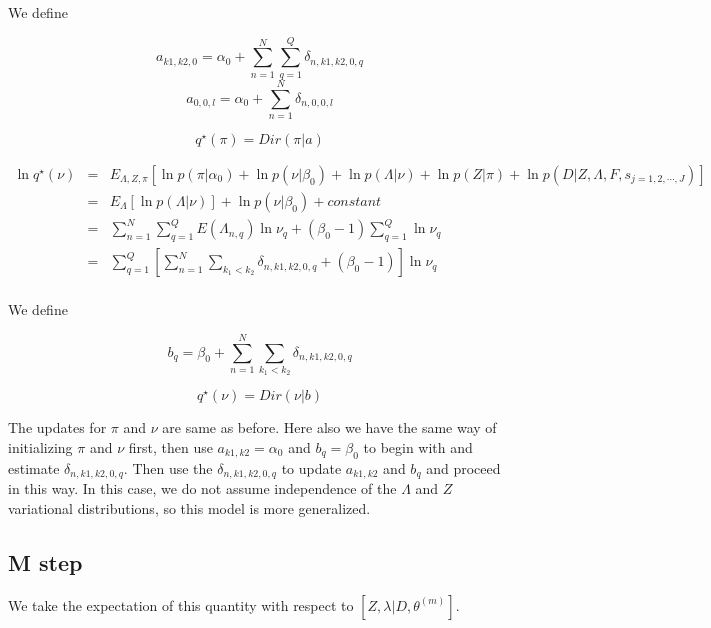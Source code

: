 \documentclass[12pt]{article}
\begin{document}
We define 

$$ a_{k1, k2, 0} = \alpha_0 + \sum_{n=1}^{N} \sum_{q=1}^{Q} \delta_{n, k1, k2, 0, q} $$
$$ a_{0, 0, l} = \alpha_0 + \sum_{n=1}^{N} \delta_{n, 0, 0, l} $$


$$ q^{\star} (\pi) = Dir(\pi | a)  $$


\begin{eqnarray} \nonumber
\ln q^{\star} (\nu) & = & E_{\Lambda, Z, \pi} \left [ \ln p(\pi|\alpha_0)+ \ln p(\nu | \beta_0) + \ln p(\Lambda | \nu) + \ln p(Z | \pi) + \ln p(D | Z, \Lambda, F, s_{j=1,2,\cdots,J}) \right ] \\  \nonumber
  & = & E_{\Lambda} \left [ \ln p(\Lambda | \nu) \right] + \ln p(\nu | \beta_0) + constant \\ \nonumber
  & = & \sum_{n=1}^{N}\sum_{q=1}^{Q} E(\Lambda_{n,q}) \ln \nu_{q} + (\beta_0 -1) \sum_{q=1}^{Q} \ln \nu_{q} \\ \nonumber
  & = & \sum_{q=1}^{Q} \left [ \sum_{n=1}^{N} \sum_{k_1 < k_2} \delta_{n, k1, k2, 0, q} + (\beta_0 -1) \right] \ln \nu_{q} \\ \nonumber
\end{eqnarray}

We define 

$$ b_{q} = \beta_0 + \sum_{n=1}^{N} \sum_{k_1 < k_2} \delta_{n, k1, k2, 0, q} $$

$$ q^{\star} (\nu) = Dir(\nu | b)  $$



The updates for $\pi$ and $\nu$ are same as before. Here also we have the same way of initializing $\pi$ and $\nu$ first, then use $a_{k1,k2}=\alpha_0$ and $b_{q}=\beta_0$ to begin with and estimate $\delta_{n,k1,k2,0,q}$. Then use the $\delta_{n,k1,k2,0,q}$ to update $a_{k1,k2}$ and $b_{q}$ and proceed in this way. In this case, we do not assume independence of the $\Lambda$ and $Z$ variational distributions, so this model is more generalized.



\subsection{M step}


%
%
%
%
We take the expectation of this quantity with respect to $\left [ Z, \lambda | D, \theta^{(m)} \right ]$.
\end{document}
